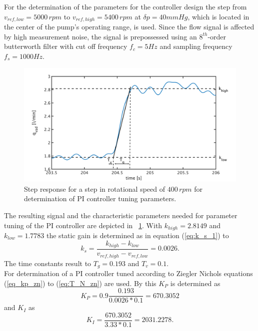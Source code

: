 For the determination of the parameters for the controller design the step from $v_{ref,low}=5000\, rpm$ to $v_{ref,high}=5400\, rpm$ at $\delta{p}=40mmHg$, which is located in the center of the pump's operating range, is used.
Since the flow signal is affected by high measurement noise, the signal is prepossessed using an $8^{th}$-order butterworth filter with cut off frequency $f_c=5Hz$ and sampling frequency $f_s=1000Hz$.
\begin{figure}[ht]
  \centering
  \includegraphics[width=\textwidth]{images/chapt_5/param_calc_PI.pdf}
  \caption[Step response for determination of PI controller tuning parameters]{Step response for a step in rotational speed of $400\,rpm$ for determination of PI controller tuning parameters.}
  \label{fig:param_calc_PI}
\end{figure}
The resulting signal and the characteristic parameters needed for parameter tuning of the PI controller are depicted in \figurename~\ref{fig:param_calc_PI}. With $k_{high}=2.8149$ and $k_{low}=1.7783$ the static gain is determined as in equation (\ref{eq:k_s_1}) to
\begin{equation}
  k_s = \frac{k_{high}-k_{low}}{v_{ref,high}-v_{ref,low}}= 0.0026.
\label{eq:k_s_2}
\end{equation}
The time constants result to $T_g=0.193$ and $T_v=0.1$.
\\For determination of a PI controller tuned according to Ziegler Nichols equations (\ref{eq_kp_zn}) to (\ref{eq:T_N_zn}) are used. By this $K_P$ is determined as
\begin{equation}
  K_{P} = 0.9\frac{0.193}{0.0026*0.1}=670.3052
\end{equation}
and $K_I$ as
\begin{equation}
  K_{I}  = \frac{670.3052}{3.33*0.1}=2031.2278.
\end{equation}

